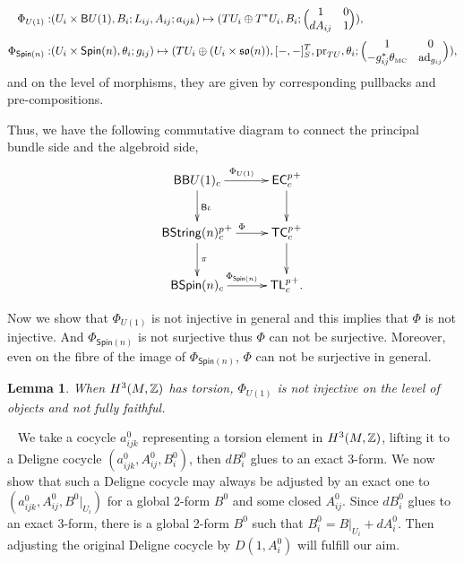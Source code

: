 \documentclass[letterpaper,10pt, oneside]{article} %
\newtheorem{lem}[thm]{Lemma}\newtheorem{lemma}[thm]{Lemma}
\newcommand{\tlpp}{{{\mathsf{TL}^{p}_{c}}}^+} %
\newcommand{\ecalgdpp}{{\mathsf{EC}^{p}_{c}}^+} %
\newcommand{\tcalgdpp}{{\mathsf{TC}^{p}_{c}}^+} %
\newcommand{\bstringnpp}{{\mathsf{BString}(n)^p_{c}}^+} %
\newcommand{\Spin}{\mathsf{Spin}}%
\newcommand{\B}{\mathsf{B}}%
\newcommand{\pf}{\noindent{\bf Proof.}\ }
\newcommand{\TM}{\theta_{\scriptscriptstyle \mathrm{MC}}}
\newcommand{\ad}{\mathrm{ad}}
\newcommand{\pr}{\mathrm{pr}}
\begin{document}
\begin{equation}
\begin{split}
\Phi_{U(1)}: & (U_i\times \B U(1), B_i; L_{ij}, A_{ij}; a_{ijk} ) \mapsto (TU_i \oplus T^*U_i, B_i; \Big( \begin{matrix} 1 & 0 \\ dA_{ij} & 1 \end{matrix} \Big)  ), \\
\Phi_{\Spin(n)}: & (U_i \times \Spin(n), \theta_i; g_{ij} ) \mapsto (TU_i\oplus (U_i\times{\so(n)}), [-,-]^T_S,  \pr_{TU},\theta_i; \Big( \begin{matrix} 1 & 0 \\ -g_{ij}^*\TM & \ad_{g_{ij}}  \end{matrix} \Big) ),
\end{split}
\end{equation}
and on the level of morphisms, they are given by corresponding pullbacks and pre-compositions.

Thus, we have the following commutative diagram to connect the principal bundle side and the algebroid side,
\begin{equation}
\xymatrix{
\B \B U(1)_c \ar[r]^{\Phi_{U(1)}} \ar[d]^{\B\iota}& \ecalgdpp \ar[d]\\
\bstringnpp \ar[r]^\Phi \ar[d]^{\pi} & \tcalgdpp \ar[d]\\
\mathsf{B}\Spin(n)_{c} \ar[r]^{\Phi_{\Spin(n)}} & \tlpp.
}
\end{equation}

Now we show that $\Phi_{U(1)}$ is not injective in general and this implies that $\Phi$ is not injective. And $\Phi_{\Spin(n)}$ is not surjective thus $\Phi$ can not be surjective. Moreover, even on the fibre of the image of $\Phi_{\Spin(n)}$, $\Phi$ can not be surjective in general.

\begin{lem}\label{lem:gerbes}
When $H^3(M, \mathbb Z)$ has torsion, $\Phi_{U(1)}$ is not injective on the level of objects and not fully faithful.
\end{lem}
\pf
We take a cocycle $a^0_{ijk}$ representing a torsion element in $H^3(M, \mathbb Z)$, lifting it to a Deligne cocycle $(a^0_{ijk}, A^0_{ij}, B^0_i)$, then $dB^0_i$ glues to an exact 3-form. We now show that such a Deligne cocycle may always be  adjusted by an exact one to $(a^0_{ijk}, A^0_{ij}, B^0|_{U_i})$ for a global 2-form $B^0$ and some closed $A^0_{ij}$. Since $dB^0_i$ glues to an exact 3-form, there is a global 2-form $B^0$ such that $B^0_i=B|_{U_i} + dA^0_i$. Then adjusting the original Deligne cocycle by $D(1, A^0_i)$ will fulfill our aim.
\end{document}
